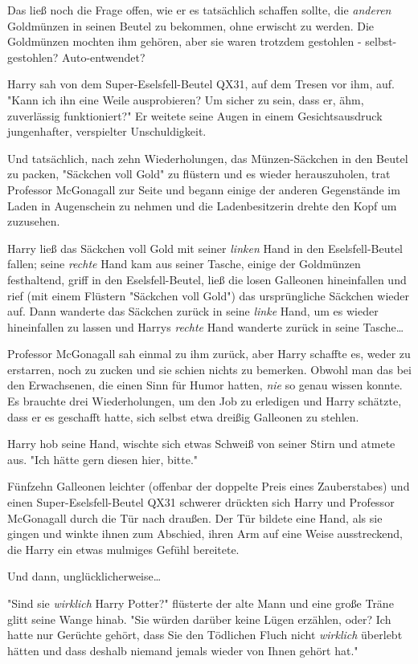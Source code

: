 {Das ließ noch die Frage offen, wie er es tatsächlich schaffen sollte, die \emph{anderen} Goldmünzen in seinen Beutel zu bekommen, ohne erwischt zu werden. Die Goldmünzen mochten ihm gehören, aber sie waren trotzdem gestohlen - selbst-gestohlen? Auto-entwendet?

Harry sah von dem Super-Eselsfell-Beutel QX31, auf dem Tresen vor ihm, auf. "Kann ich ihn eine Weile ausprobieren? Um sicher zu sein, dass er, ähm, zuverlässig funktioniert?" Er weitete seine Augen in einem Gesichtsausdruck jungenhafter, verspielter Unschuldigkeit.

Und tatsächlich, nach zehn Wiederholungen, das Münzen-Säckchen in den Beutel zu packen, "Säckchen voll Gold" zu flüstern und es wieder herauszuholen, trat Professor McGonagall zur Seite und begann einige der anderen Gegenstände im Laden in Augenschein zu nehmen und die Ladenbesitzerin drehte den Kopf um zuzusehen.

Harry ließ das Säckchen voll Gold mit seiner \emph{linken} Hand in den Eselsfell-Beutel fallen; seine \emph{rechte} Hand kam aus seiner Tasche, einige der Goldmünzen festhaltend, griff in den Eselsfell-Beutel, ließ die losen Galleonen hineinfallen und rief (mit einem Flüstern "Säckchen voll Gold") das ursprüngliche Säckchen wieder auf. Dann wanderte das Säckchen zurück in seine \emph{linke} Hand, um es wieder hineinfallen zu lassen und Harrys \emph{rechte} Hand wanderte zurück in seine Tasche…

Professor McGonagall sah einmal zu ihm zurück, aber Harry schaffte es, weder zu erstarren, noch zu zucken und sie schien nichts zu bemerken. Obwohl man das bei den Erwachsenen, die einen Sinn für Humor hatten, \emph{nie} so genau wissen konnte. Es brauchte drei Wiederholungen, um den Job zu erledigen und Harry schätzte, dass er es geschafft hatte, sich selbst etwa dreißig Galleonen zu stehlen.

Harry hob seine Hand, wischte sich etwas Schweiß von seiner Stirn und atmete aus. "Ich hätte gern diesen hier, bitte."

Fünfzehn Galleonen leichter (offenbar der doppelte Preis eines Zauberstabes) und einen Super-Eselsfell-Beutel QX31 schwerer drückten sich Harry und Professor McGonagall durch die Tür nach draußen. Der Tür bildete eine Hand, als sie gingen und winkte ihnen zum Abschied, ihren Arm auf eine Weise ausstreckend, die Harry ein etwas mulmiges Gefühl bereitete.

Und dann, unglücklicherweise…

"Sind sie \emph{wirklich} Harry Potter?" flüsterte der alte Mann und eine große Träne glitt seine Wange hinab. "Sie würden darüber keine Lügen erzählen, oder? Ich hatte nur Gerüchte gehört, dass Sie den Tödlichen Fluch nicht \emph{wirklich} überlebt hätten und dass deshalb niemand jemals wieder von Ihnen gehört hat."

}
